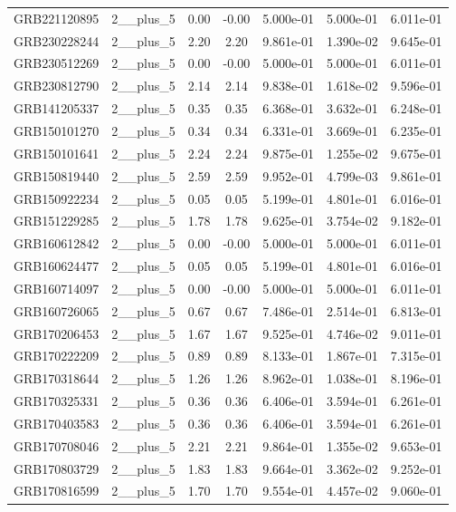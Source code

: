 \documentclass[12pt]{article}
\begin{document}
\begin{table}[h!]
{\begin{tabular}{l c c c c c c}
GRB221120895 & 2__plus_5 & 0.00 & -0.00 & 5.000e-01 & 5.000e-01 & 6.011e-01 \\
GRB230228244 & 2__plus_5 & 2.20 & 2.20 & 9.861e-01 & 1.390e-02 & 9.645e-01 \\
GRB230512269 & 2__plus_5 & 0.00 & -0.00 & 5.000e-01 & 5.000e-01 & 6.011e-01 \\
GRB230812790 & 2__plus_5 & 2.14 & 2.14 & 9.838e-01 & 1.618e-02 & 9.596e-01 \\
GRB141205337 & 2__plus_5 & 0.35 & 0.35 & 6.368e-01 & 3.632e-01 & 6.248e-01 \\
GRB150101270 & 2__plus_5 & 0.34 & 0.34 & 6.331e-01 & 3.669e-01 & 6.235e-01 \\
GRB150101641 & 2__plus_5 & 2.24 & 2.24 & 9.875e-01 & 1.255e-02 & 9.675e-01 \\
GRB150819440 & 2__plus_5 & 2.59 & 2.59 & 9.952e-01 & 4.799e-03 & 9.861e-01 \\
GRB150922234 & 2__plus_5 & 0.05 & 0.05 & 5.199e-01 & 4.801e-01 & 6.016e-01 \\
GRB151229285 & 2__plus_5 & 1.78 & 1.78 & 9.625e-01 & 3.754e-02 & 9.182e-01 \\
GRB160612842 & 2__plus_5 & 0.00 & -0.00 & 5.000e-01 & 5.000e-01 & 6.011e-01 \\
GRB160624477 & 2__plus_5 & 0.05 & 0.05 & 5.199e-01 & 4.801e-01 & 6.016e-01 \\
GRB160714097 & 2__plus_5 & 0.00 & -0.00 & 5.000e-01 & 5.000e-01 & 6.011e-01 \\
GRB160726065 & 2__plus_5 & 0.67 & 0.67 & 7.486e-01 & 2.514e-01 & 6.813e-01 \\
GRB170206453 & 2__plus_5 & 1.67 & 1.67 & 9.525e-01 & 4.746e-02 & 9.011e-01 \\
GRB170222209 & 2__plus_5 & 0.89 & 0.89 & 8.133e-01 & 1.867e-01 & 7.315e-01 \\
GRB170318644 & 2__plus_5 & 1.26 & 1.26 & 8.962e-01 & 1.038e-01 & 8.196e-01 \\
GRB170325331 & 2__plus_5 & 0.36 & 0.36 & 6.406e-01 & 3.594e-01 & 6.261e-01 \\
GRB170403583 & 2__plus_5 & 0.36 & 0.36 & 6.406e-01 & 3.594e-01 & 6.261e-01 \\
GRB170708046 & 2__plus_5 & 2.21 & 2.21 & 9.864e-01 & 1.355e-02 & 9.653e-01 \\
GRB170803729 & 2__plus_5 & 1.83 & 1.83 & 9.664e-01 & 3.362e-02 & 9.252e-01 \\
GRB170816599 & 2__plus_5 & 1.70 & 1.70 & 9.554e-01 & 4.457e-02 & 9.060e-01 \\

\end{tabular}}
\end{table}
\end{document}
